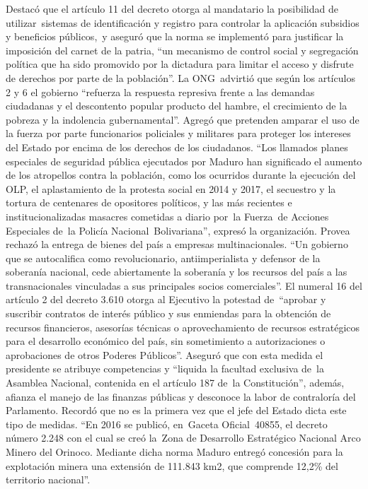 \documentclass{article}%
\begin{document}
%
Destacó que el artículo 11 del decreto otorga al mandatario la posibilidad de utilizar~sistemas de identificación y registro para controlar la aplicación subsidios y beneficios públicos,~y aseguró que la norma se implementó para justificar la imposición del carnet de la patria, “un mecanismo de control social y segregación política que ha sido promovido por la dictadura para limitar el acceso y disfrute de derechos por parte de la población”.%
\newline%
%
La ONG~advirtió que según los artículos 2 y 6 el gobierno “refuerza la respuesta represiva frente a las demandas ciudadanas y el descontento popular producto del hambre, el crecimiento de la pobreza y la indolencia gubernamental”. Agregó que pretenden amparar el uso de la fuerza por parte funcionarios policiales y militares para proteger los intereses del Estado por encima de los derechos de los ciudadanos.%
\newline%
%
“Los llamados planes especiales de seguridad pública ejecutados por Maduro han significado el aumento de los atropellos contra la población, como los ocurridos durante la ejecución del OLP, el aplastamiento de la protesta social en 2014 y 2017, el secuestro y la tortura de centenares de opositores políticos, y las más recientes e institucionalizadas masacres cometidas a diario por~la Fuerza~de Acciones Especiales de~la Policía Nacional~Bolivariana”, expresó la organización.%
\newline%
%
Provea rechazó la entrega de bienes del país a empresas multinacionales. “Un gobierno que se autocalifica como revolucionario, antiimperialista y defensor de la soberanía nacional, cede abiertamente la soberanía y los recursos del país a las transnacionales vinculadas a sus principales socios comerciales”.%
\newline%
%
El numeral 16 del artículo 2 del decreto 3.610 otorga al Ejecutivo la potestad de~“aprobar y suscribir contratos de interés público y sus enmiendas para la obtención de recursos financieros, asesorías técnicas o aprovechamiento de recursos estratégicos para el desarrollo económico del país, sin sometimiento a autorizaciones o aprobaciones de otros Poderes Públicos”.%
\newline%
%
Aseguró que con esta medida el presidente se atribuye competencias y “liquida la facultad exclusiva de~la Asamblea Nacional, contenida en el artículo 187 de~la Constitución”, además, afianza el manejo de las finanzas públicas y desconoce la labor de contraloría del Parlamento.%
\newline%
%
Recordó que no es la primera vez que el jefe del Estado dicta este tipo de medidas. “En 2016 se publicó, en~Gaceta Oficial~40855, el decreto número 2.248 con el cual se creó la~Zona de Desarrollo Estratégico Nacional Arco Minero del Orinoco. Mediante dicha norma Maduro entregó concesión para la explotación minera una extensión de 111.843 km2, que comprende 12,2\% del territorio nacional”.%
\newline%
%
\end{document}
